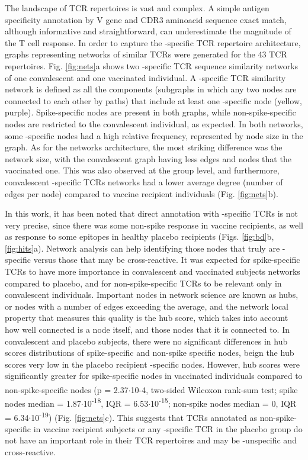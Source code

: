 The landscape of TCR repertoires is vast and complex. A simple antigen specificity annotation by V gene and CDR3 aminoacid sequence exact match, although informative and straightforward, can underestimate the magnitude of the T cell response. In order to capture the \covid-specific TCR repertoire architecture, graphs representing networks of similar TCRs were generated for the 43 TCR repertoires. Fig. \ref{fig:nets}a shows two \covid-specific TCR sequence similarity networks of one convalescent and one vaccinated individual. A \covid-specific TCR similarity network is defined as all the components (subgraphs in which any two nodes are connected to each other by paths) that include at least one \covid-specific node (yellow, purple). Spike-specific nodes are present in both graphs, while non-spike-specific nodes are restricted to the convalescent individual, as expected. In both networks, some \covid-specific nodes had a high relative frequency, represented by node size in the graph. As for the networks architecture, the most striking difference was the network size, with the convalescent graph having less edges and nodes that the vaccinated one. This was also observed at the group level, and furthermore, convalescent \covid-specific TCRs networks had a lower average degree (number of edges per node) compared to vaccine recipient individuals (Fig. \ref{fig:nets}b).

In this work, it has been noted that direct annotation with \covid-specific TCRs is not very precise, since there was some non-spike response in vaccine recipients, as well as response to some \covid{} epitopes in healthy placebo recipients (Figs. \ref{fig:bd}b, \ref{fig:hits}a). Network analysis can help identifying those nodes that truly are \covid-specific versus those that may be cross-reactive. It was expected for spike-specific TCRs to have more importance in convalescent and vaccinated subjects networks compared to placebo, and for non-spike-specific TCRs to be relevant only in convalescent individuals. Important nodes in network science are known as hubs, or nodes with a number of edges exceeding the average, and the network local property that measures this quality is the hub score, which takes into account how well connected is a node itself, and those nodes that it is connected to. In convalescent and placebo subjects, there were no significant differences in hub scores distributions of spike-specific and non-spike specific nodes, beign the hub scores very low in the placebo recipient \covid-specific nodes. However, hub scores were significantly greater for spike-specific nodes in vaccinated individuals compared to non-spike-specific nodes (p = 2.37$\cdot$10\textsuperscript{}{-4}, two-sided Wilcoxon rank-sum test; spike nodes median = 1.87$\cdot$10\textsuperscript{-18}, IQR = 6.53$\cdot$10\textsuperscript{-15}; non-spike nodes median = 0, IQR = 6.34$\cdot$10\textsuperscript{-19}) (Fig. \ref{fig:nets}c). This suggests that TCRs annotated as non-spike-specific in vaccine recipient subjects or any \covid-specific TCR in the placebo group do not have an important role in their TCR repertoires and may be \covid-unspecific and cross-reactive.

